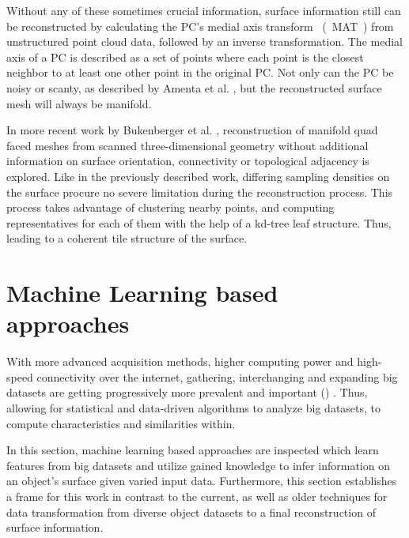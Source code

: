   
  Without any of these sometimes crucial information, surface information still can be reconstructed by
  calculating the PC's medial axis transform ~(~MAT~) from unstructured point cloud
  data, followed by an inverse transformation.  The medial axis of a PC
  is described as a set of points where each point is the closest neighbor 
  to at least one other point in the original PC. Not only can the PC be noisy 
  or scanty, as described by Amenta et al. \cite{Amenta:2001:PC:376957.376986}, but the reconstructed
  surface mesh will always be manifold.

  In more recent work by Bukenberger et al. \cite{bukenberger2018hierarchical},
  reconstruction of manifold quad faced meshes from 
  scanned three-dimensional geometry without additional
  information on surface orientation, connectivity or topological
  adjacency is explored. Like in the previously described work,
  differing sampling densities on the surface procure no severe 
  limitation during the reconstruction process. This process takes
  advantage of clustering nearby points, and computing 
  representatives for each of them with the help of a kd-tree 
  leaf structure. Thus, leading to a coherent tile structure 
  of the surface. 



\section{Machine Learning based approaches}
\label{ml_approaches}
With more advanced acquisition methods, higher computing power 
and high-speed connectivity over the internet, gathering, interchanging
 and expanding big datasets are getting progressively more prevalent
  and important () . 
  Thus, allowing for statistical and data-driven algorithms to 
  analyze big datasets, to compute characteristics and similarities
   within. 
   
   In this section, machine learning based approaches are inspected which learn features from big datasets and utilize gained knowledge to infer information on an object's surface given varied input data.
Furthermore, this section establishes a frame for this work in 
contrast to the current, as well as older techniques for data 
transformation from diverse object datasets to a final reconstruction
 of surface information.

